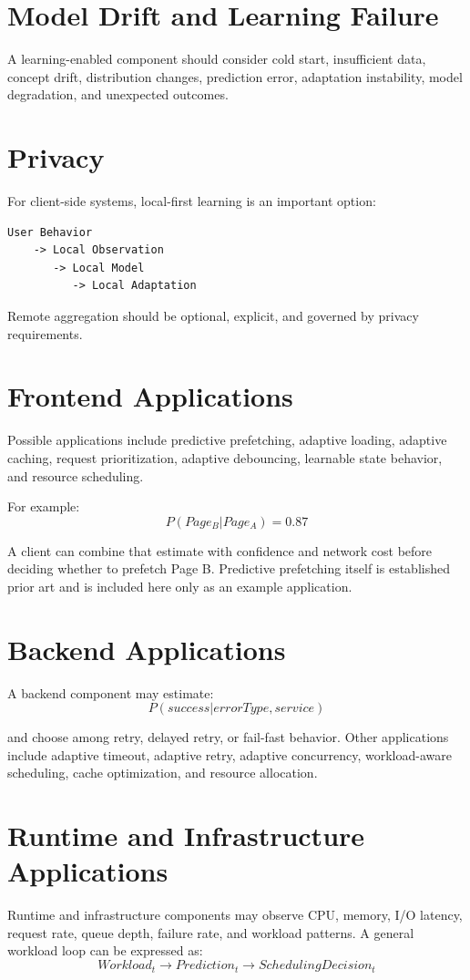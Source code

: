 \documentclass[11pt,a4paper]{article}
\begin{document}
\section{Model Drift and Learning Failure}
A learning-enabled component should consider cold start, insufficient data, concept drift, distribution changes, prediction error, adaptation instability, model degradation, and unexpected outcomes.

\section{Privacy}
For client-side systems, local-first learning is an important option:
\begin{lstlisting}
User Behavior
    -> Local Observation
       -> Local Model
          -> Local Adaptation
\end{lstlisting}

Remote aggregation should be optional, explicit, and governed by privacy requirements.

\section{Frontend Applications}
Possible applications include predictive prefetching, adaptive loading, adaptive caching, request prioritization, adaptive debouncing, learnable state behavior, and resource scheduling.

For example:
\[
P(Page_B|Page_A)=0.87
\]

A client can combine that estimate with confidence and network cost before deciding whether to prefetch Page B. Predictive prefetching itself is established prior art and is included here only as an example application.

\section{Backend Applications}
A backend component may estimate:
\[
P(success|errorType,service)
\]

and choose among retry, delayed retry, or fail-fast behavior. Other applications include adaptive timeout, adaptive retry, adaptive concurrency, workload-aware scheduling, cache optimization, and resource allocation.

\section{Runtime and Infrastructure Applications}
Runtime and infrastructure components may observe CPU, memory, I/O latency, request rate, queue depth, failure rate, and workload patterns. A general workload loop can be expressed as:
\[
Workload_t \rightarrow Prediction_t \rightarrow SchedulingDecision_t
\]
\end{document}
